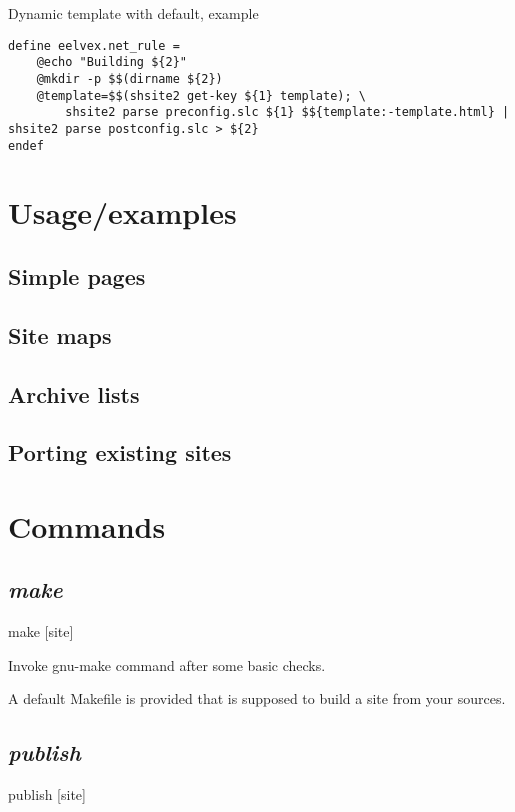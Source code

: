 \documentclass{memoir}
\begin{document}
Dynamic template with default, example
\tabson
\begin{verbatim}
define eelvex.net_rule =
	@echo "Building ${2}"
	@mkdir -p $$(dirname ${2})
	@template=$$(shsite2 get-key ${1} template); \
		shsite2 parse preconfig.slc ${1} $${template:-template.html} | shsite2 parse postconfig.slc > ${2}
endef
\end{verbatim}





\chapter{Usage/examples} %

	\section{Simple pages} %


	\section{Site maps} %


	\section{Archive lists} %


	\section{Porting existing sites} %



\chapter{Commands} %

	\section{\emph{make}} %
	make [site]

	Invoke gnu-make command after some basic checks.

	A default Makefile is provided that is supposed to build a site from your sources.
	\section{\emph{publish}} %
	publish [site]
\end{document}
